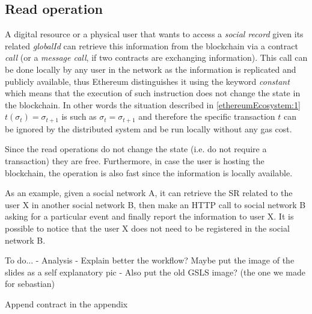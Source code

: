 \subsection{Read operation}

A digital resource or a physical user that wants to access a \textit{social record} given its related \textit{globalId} can retrieve this information from the blockchain via a contract \textit{call} (or a \textit{message call}, if two contracts are exchanging information).
This call can be done locally by any user in the network as the information is replicated and publicly available, thus Ethereum distinguishes it using the keyword \textit{constant} which means that the execution of such instruction does not change the state in the blockchain.
In other words the situation described in \ref{ethereumEcosystem:1} $t(\sigma_t) = \sigma_{t+1}$ is such as $\sigma_t = \sigma_{t+1}$ and therefore the specific transaction $t$ can be ignored by the distributed system and be run locally without any gas cost.

Since the read operations do not change the state (i.e. do not require a transaction) they are free. Furthermore, in case the user is hosting the blockchain, the operation is also fast since the information is locally available.

As an example, given a social network A, it can retrieve the SR related to the user X in another social network B, then make an HTTP call to social network B asking for a particular event and finally report the information to user X. It is possible to notice that the user X does not need to be registered in the social network B.

\begin{notation}
  To do... 
  - Analysis 
  - Explain better the workflow? Maybe put the image of the slides as a self explanatory pic
  - Also put the old GSLS image? (the one we made for sebastian)
\end{notation}


\begin{notation}
  Append contract in the appendix
\end{notation}